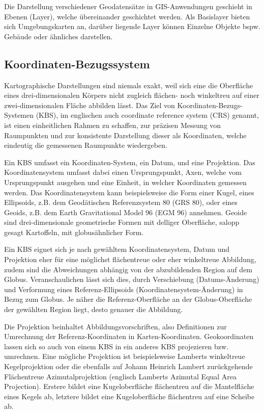 		Die Darstellung verschiedener Geodatensätze in GIS-Anwendungen geschieht in Ebenen (Layer), welche übereinander geschichtet werden. Als Basislayer bieten sich Umgebungskarten an, darüber liegende Layer können Einzelne Objekte bspw. Gebäude oder ähnliches darstellen. 
	
		\subsection{Koordinaten-Bezugssystem}
			Kartographische Darstellungen sind niemals exakt, weil sich eine die Oberfläche eines drei-dimensionalen Körpers nicht zugleich flächen- noch winkeltreu auf einer zwei-dimensionalen Fläche abbilden lässt. Das Ziel von Koordinaten-Bezugs-Systemen (KBS), im englischen auch coordinate reference system (CRS) genannt, ist einen einheitlichen Rahmen zu schaffen, zur präzisen Messung von Raumpunkten und zur konsistente Darstellung dieser als Koordinaten, welche eindeutig die gemessenen Raumpunkte wiedergeben. 
			
			Ein KBS umfasst ein Koordinaten-System, ein Datum, und eine Projektion. Das Koordinatensystem umfasst dabei einen Ursprungspunkt, Axen, welche vom Ursprungspunkt ausgehen und eine Einheit, in welcher Koordinaten gemessen werden. Das Koordinatensystem kann beispielsweise die Form einer Kugel, eines Ellipsoids, z.B. dem Geodätischen Referenzsystem 80 (GRS 80), oder eines Geoids, z.B. dem Earth Gravitational Model 96 (EGM 96) annehmen. Geoide sind drei-dimensionale geometrische Formen mit delliger Oberfläche, salopp gesagt \frqq Kartoffeln\flqq, mit globusähnlicher Form. \cite{web_wikipedia_crs}
			
			Ein KBS eignet sich je nach gewähltem Koordinatensystem, Datum und Projektion eher für eine möglichst flächentreue oder eher winkeltreue Abbildung, zudem sind die Abweichungen abhängig von der abzubildenden Region auf dem Globus. Veranschaulichen lässt sich dies, durch Verschiebung (Datums-Änderung) und Verformung eines Referenz-Ellipsoids (Koordinatensystem-Änderung) in Bezug zum Globus. Je näher die Referenz-Oberfläche an der Globus-Oberfläche der gewählten Region liegt, desto genauer die Abbildung. 
			
			Die Projektion beinhaltet Abbildungsvorschriften, also Definitionen zur Umrechnung der Referenz-Koordinaten in Karten-Koordinaten. Geokoordinaten lassen sich so auch von einem KBS in ein anderes KBS projezieren bzw. umrechnen. Eine mögliche Projektion ist beispielsweise Lamberts winkeltreue Kegelprojektion oder die ebenfalls auf Johann Heinrich Lambert zurückgehende Flächentreue Azimutalprojektion (englisch Lamberts Azimutal Equal Area Projection). Erstere bildet eine Kugeloberfläche flächentreu auf die Mantelfläche eines Kegels ab, letztere bildet eine Kugeloberfläche flächentreu auf eine Scheibe ab. \cite{web_wikipedia_lambert_conformal_cone_projection}\cite{web_wikipedia_lambert_azimutal_equal_area_projection}
			
